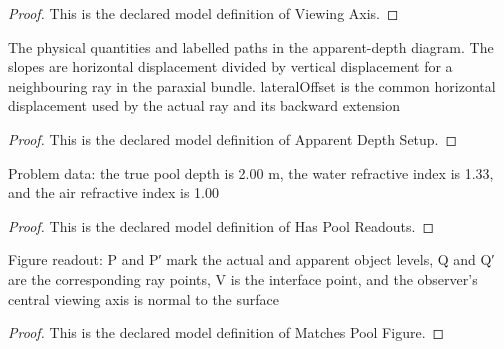 \begin{proof}
  This is the declared model definition of Viewing Axis.
\end{proof}
\begin{definition}
  \label{def:physics:phyx-mini-0042:phyxminiproblems-problemphyxmini0042-apparentdepthsetup}
  The physical quantities and labelled paths in the apparent-depth diagram. The slopes are horizontal displacement divided by vertical displacement for a neighbouring ray in the paraxial bundle. lateralOffset is the common horizontal displacement used by the actual ray and its backward extension
\end{definition}
\begin{proof}
  This is the declared model definition of Apparent Depth Setup.
\end{proof}
\begin{definition}
  \label{def:physics:phyx-mini-0042:phyxminiproblems-problemphyxmini0042-haspoolreadouts}
  Problem data: the true pool depth is 2.00 m, the water refractive index is 1.33, and the air refractive index is 1.00
\end{definition}
\begin{proof}
  This is the declared model definition of Has Pool Readouts.
\end{proof}
\begin{definition}
  \label{def:physics:phyx-mini-0042:phyxminiproblems-problemphyxmini0042-matchespoolfigure}
  Figure readout: P and P′ mark the actual and apparent object levels, Q and Q′ are the corresponding ray points, V is the interface point, and the observer's central viewing axis is normal to the surface
\end{definition}
\begin{proof}
  This is the declared model definition of Matches Pool Figure.
\end{proof}
